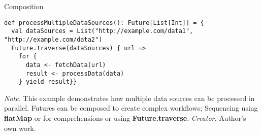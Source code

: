 \begin{table}[h!]
\caption{Composition}
\begin{lstlisting}
def processMultipleDataSources(): Future[List[Int]] = {
  val dataSources = List("http://example.com/data1", "http://example.com/data2")
  Future.traverse(dataSources) { url =>
    for {
      data <- fetchData(url)
      result <- processData(data)
    } yield result}}
\end{lstlisting}
\small
\textit{Note.} This example demonstrates how multiple data sources can be processed in parallel. Futures can be composed to create complex workflows; Sequencing using \textbf{flatMap} or for-comprehensions or using \textbf{Future.traverse}.
\textit{Creator.} Author's own work.
\end{table}